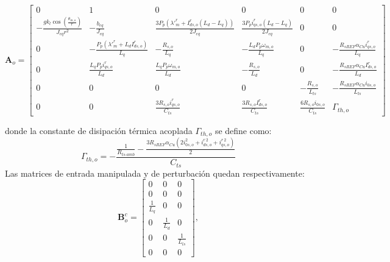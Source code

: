 \documentclass[12pt, a4paper,journal, onecolumn, compsoc]{IEEEtran}
\begin{document}
\begin{equation*}
\bm{A}_o = \begin{bmatrix}
0 & 1 & 0 & 0 & 0 & 0 \\
-\frac{g k_l \cos\left(\frac{\theta_{m,o}}{r}\right)}{J_{eq} r^2} & -\frac{b_{eq}}{J_{eq}} & \frac{3 P_p (\lambda'^r_m + I^r_{ds,o} (L_d - L_q))}{2 J_{eq}} & \frac{3 P_p i^r_{qs,o} (L_d - L_q)}{2 J_{eq}} & 0 & 0 \\
0 & -\frac{P_p (\lambda'^r_m + L_d I^r_{ds,o})}{L_q} & -\frac{R_{s,o}}{L_q} & -\frac{L_d P_p \omega_{m,o}}{L_q} & 0 & -\frac{R_{sREF} \alpha_{Cu} i^r_{qs,o}}{L_q} \\
0 & \frac{L_q P_p i^r_{qs,o}}{L_d} & \frac{L_q P_p \omega_{m,o}}{L_d} & -\frac{R_{s,o}}{L_d} & 0 & -\frac{R_{sREF} \alpha_{Cu} I^r_{ds,o}}{L_d} \\
0 & 0 & 0 & 0 & -\frac{R_{s,o}}{L_{ls}} & -\frac{R_{sREF} \alpha_{Cu} i_{0s,o}}{L_{ls}} \\
0 & 0 & \frac{3 R_{s,o} i^r_{qs,o}}{C_{ts}} & \frac{3 R_{s,o} I^r_{ds,o}}{C_{ts}} & \frac{6 R_{s,o} i_{0s,o}}{C_{ts}} & \Gamma_{th,o}
\end{bmatrix}
\end{equation*}

donde la constante de disipación térmica acoplada $\Gamma_{th,o}$ se define como:
\begin{equation*}
\Gamma_{th,o} = -\frac{\frac{1}{R_{ts\text{-}amb}} - \frac{3 R_{sREF} \alpha_{Cu} (2 i_{0s,o}^2 + i^{r\,2}_{ds,o} + i^{r\,2}_{qs,o})}{2}}{C_{ts}}
\end{equation*}
Las matrices de entrada manipulada y de perturbación quedan respectivamente:
\begin{equation*}
\bm B_o^c = \begin{bmatrix}
0 & 0 & 0 \\
0 & 0 & 0 \\
\frac{1}{L_q} & 0 & 0 \\
0 & \frac{1}{L_d} & 0 \\
0 & 0 & \frac{1}{L_{ls}} \\
0 & 0 & 0
\end{bmatrix},
\end{equation*}
\end{document}
